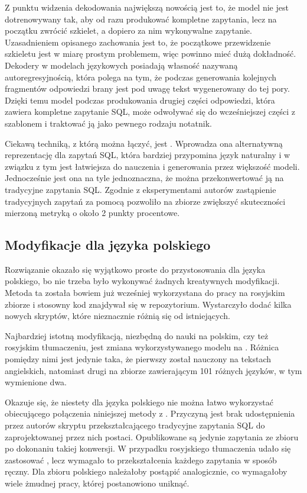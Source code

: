 Z punktu widzenia dekodowania największą nowością jest to, że model  nie jest dotrenowywany tak, aby od razu produkować kompletne zapytania, lecz na początku zwrócić szkielet, a dopiero za nim wykonywalne zapytanie. Uzasadnieniem opisanego zachowania jest to, że początkowe przewidzenie szkieletu jest w miarę prostym problemem, więc powinno mieć dużą dokładność. Dekodery w modelach językowych posiadają własność nazywaną autoregresyjnością, która polega na tym, że podczas generowania kolejnych fragmentów odpowiedzi brany jest pod uwagę tekst wygenerowany do tej pory. Dzięki temu model  podczas produkowania drugiej części odpowiedzi, która zawiera kompletne zapytanie SQL, może odwoływać się do wcześniejszej części z szablonem i traktować ją jako pewnego rodzaju notatnik.

Ciekawą techniką, z którą  można łączyć, jest  . Wprowadza ona alternatywną reprezentację dla zapytań SQL, która bardziej przypomina język naturalny i w związku z tym jest łatwiejsza do nauczenia i generowania przez większość modeli. Jednocześnie jest ona na tyle jednoznaczna, że można przekonwertować ją na tradycyjne zapytania SQL. Zgodnie z eksperymentami autorów  zastąpienie tradycyjnych zapytań za pomocą  pozwoliło na zbiorze  zwiększyć skuteczności mierzoną metryką  o około 2 punkty procentowe.

\subsection{Modyfikacje dla języka polskiego}
Rozwiązanie  okazało się wyjątkowo proste do przystosowania dla języka polskiego, bo nie trzeba było wykonywać żadnych kreatywnych modyfikacji. Metoda ta została bowiem już wcześniej wykorzystana do pracy na rosyjskim zbiorze  i stosowny kod znajdywał się w repozytorium. Wystarczyło dodać kilka nowych skryptów, które nieznacznie różnią się od istniejących.

Najbardziej istotną modyfikacją, niezbędną do nauki na polskim, czy też rosyjskim tłumaczeniu, jest zmiana wykorzystywanego modelu  na  . Różnica pomiędzy nimi jest jedynie taka, że pierwszy został nauczony na tekstach angielskich, natomiast drugi na zbiorze zawierającym 101 różnych języków, w tym wymienione dwa.

Okazuje się, że niestety dla języka polskiego nie można łatwo wykorzystać obiecującego połączenia niniejszej metody z . Przyczyną jest brak udostępnienia przez autorów  skryptu przekształcającego tradycyjne zapytania SQL do zaprojektowanej przez nich postaci. Opublikowane są jedynie zapytania ze zbioru  po dokonaniu takiej konwersji. W przypadku rosyjskiego tłumaczenia udało się zastosować , lecz wymagało to przekształcenia każdego zapytania w sposób ręczny. Dla zbioru polskiego należałoby postąpić analogicznie, co wymagałoby wiele żmudnej pracy, której postanowiono uniknąć.

